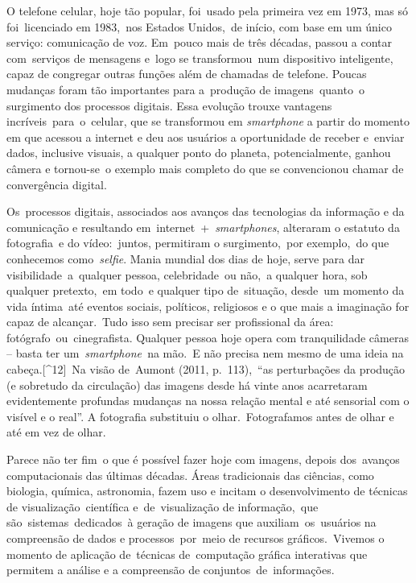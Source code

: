 \documentclass[
  letterpaper,
  a4paper,
  12pt]{scrbook}
\begin{document}
O telefone celular, hoje tão popular, foi~usado pela primeira vez em
1973, mas só foi~licenciado em 1983,~nos Estados Unidos,~de início, com
base em um único serviço: comunicação de voz. Em~pouco mais de três
décadas, passou a contar com~serviços de mensagens e~logo se
transformou~num dispositivo inteligente, capaz de congregar outras
funções além de chamadas de telefone. Poucas mudanças foram tão
importantes para a~produção de imagens~quanto~o surgimento dos processos
digitais. Essa evolução trouxe vantagens incríveis~para~o~celular, que
se transformou em \emph{smartphone} a partir do momento em que acessou a
internet e deu aos usuários a oportunidade de receber e~enviar dados,
inclusive visuais, a qualquer ponto do planeta, potencialmente, ganhou
câmera e tornou-se~o exemplo mais completo do que se convencionou chamar
de convergência digital.

Os~processos digitais, associados aos avanços das tecnologias da
informação e da comunicação e resultando
em~internet~+~\emph{smartphones}, alteraram o estatuto da fotografia~e
do vídeo:~juntos, permitiram o surgimento,~por exemplo,~do que
conhecemos como~\emph{selfie}. Mania mundial dos dias de hoje, serve
para dar visibilidade~a~qualquer pessoa, celebridade~ou não,~a qualquer
hora, sob qualquer pretexto,~em todo~e qualquer tipo de~situação,
desde~um momento da vida íntima~até eventos sociais, políticos,
religiosos e o que mais a imaginação for capaz de alcançar.~Tudo isso
sem precisar ser profissional da área: fotógrafo~ou~cinegrafista.
Qualquer pessoa hoje opera com tranquilidade câmeras -- basta ter
um~\emph{smartphone~}na mão.~E não precisa nem mesmo de uma ideia na
cabeça.{[}\^{}12{]}~Na visão de~Aumont (2011, p.~113),~``as perturbações
da produção (e sobretudo da circulação) das imagens desde há vinte anos
acarretaram evidentemente profundas mudanças na nossa relação mental e
até sensorial com o visível e o real''. A fotografia substituiu o
olhar.~Fotografamos antes de olhar e até em vez de olhar.

Parece não ter fim~o que é possível fazer hoje com imagens, depois
dos~avanços computacionais das últimas décadas. Áreas tradicionais das
ciências, como biologia, química, astronomia, fazem uso e incitam o
desenvolvimento de técnicas de visualização~científica e~de~visualização
de informação,~que são~sistemas~dedicados~à geração de imagens que
auxiliam~os~usuários na compreensão de dados e processos~por~meio de
recursos gráficos.~Vivemos o momento de aplicação de~técnicas
de~computação gráfica interativas que permitem a análise e a compreensão
de conjuntos~de~informações.~
\end{document}
